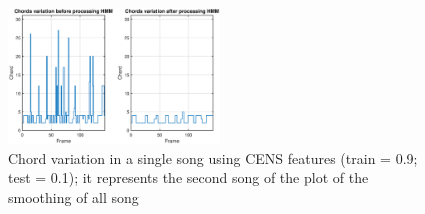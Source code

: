 \begin{figure} [h!]
	\includegraphics[width=0.5\textwidth]{img/Result_HMM/SMOOTHING/SmoothSingleSongCENS0109}
	\caption{Chord variation in a single song using CENS features (train = 0.9; test = 0.1); it represents the second song of the plot of the smoothing of all song}
\end{figure}
